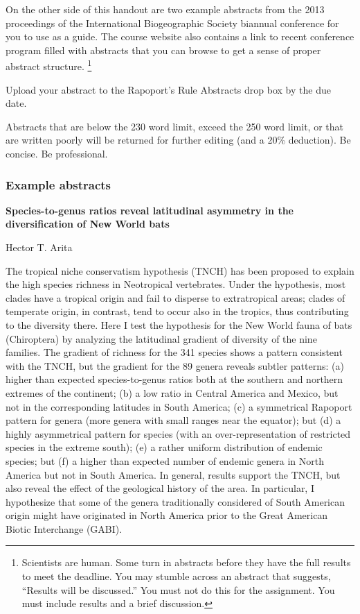 \documentclass[11pt]{article}
\begin{document}
On the other side of this handout are two example abstracts from the
2013 proceedings of the International Biogeographic Society biannual
conference for you to use as a guide. The course website also contains a
link to recent conference program filled with abstracts that you can 
browse to get a sense of proper abstract structure.%
\footnote{Scientists are human. Some turn in abstracts
before they have the full results to meet the deadline. You may
stumble across an abstract that suggests, ``Results will be
discussed.'' You must not do this for the assignment. You must include
results and a brief discussion.}

Upload your abstract to the Rapoport's Rule Abstracts 
drop box by the due date.

Abstracts that are below the 230 word limit, exceed the 250 word limit, 
or that are written poorly will be returned for further editing 
(and a 20\% deduction). Be concise. Be professional.

\newpage

\subsubsection*{Example abstracts}

\textbf{Species-to-genus ratios reveal latitudinal asymmetry in the
diversification of New World bats}

Hector T. Arita

The tropical niche conservatism hypothesis (TNCH) has been proposed to
explain the high species richness in Neotropical vertebrates. Under the
hypothesis, most clades have a tropical origin and fail to disperse to
extratropical areas; clades of temperate origin, in contrast, tend to
occur also in the tropics, thus contributing to the diversity there.
Here I test the hypothesis for the New World fauna of bats (Chiroptera)
by analyzing the latitudinal gradient of diversity of the nine families.
The gradient of richness for the 341 species shows a pattern consistent
with the TNCH, but the gradient for the 89 genera reveals subtler
patterns: (a) higher than expected species-to-genus ratios both at the
southern and northern extremes of the continent; (b) a low ratio in
Central America and Mexico, but not in the corresponding latitudes in
South America; (c) a symmetrical Rapoport pattern for genera (more
genera with small ranges near the equator); but (d) a highly
asymmetrical pattern for species (with an over-representation of
restricted species in the extreme south); (e) a rather uniform
distribution of endemic species; but (f) a higher than expected number
of endemic genera in North America but not in South America. In general,
results support the TNCH, but also reveal the effect of the geological
history of the area. In particular, I hypothesize that some of the
genera traditionally considered of South American origin might have
originated in North America prior to the Great American Biotic
Interchange (GABI).
\end{document}
